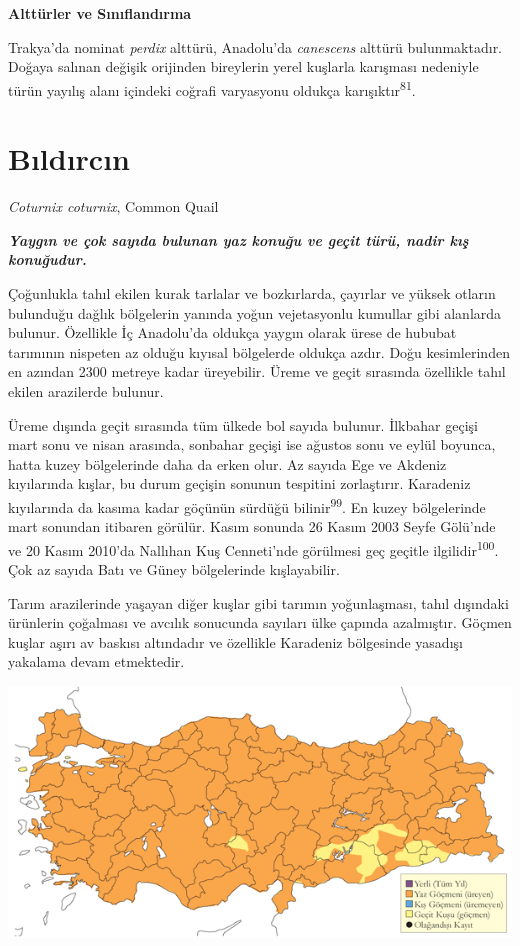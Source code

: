 \documentclass[
  letterpaper,
  DIV=11,
  numbers=noendperiod]{scrreprt}
\begin{document}
\textbf{Alttürler ve Sınıflandırma}

Trakya'da nominat \emph{perdix} alttürü, Anadolu'da \emph{canescens}
alttürü bulunmaktadır. Doğaya salınan değişik orijinden bireylerin yerel
kuşlarla karışması nedeniyle türün yayılış alanı içindeki coğrafi
varyasyonu oldukça karışıktır\textsuperscript{81}.

\hypertarget{bux131ldux131rcux131n}{%
\section{Bıldırcın}\label{bux131ldux131rcux131n}}

\emph{Coturnix coturnix}, Common Quail

\textbf{\emph{Yaygın ve çok sayıda bulunan yaz konuğu ve geçit türü,
nadir kış konuğudur.}}

Çoğunlukla tahıl ekilen kurak tarlalar ve bozkırlarda, çayırlar ve
yüksek otların bulunduğu dağlık bölgelerin yanında yoğun vejetasyonlu
kumullar gibi alanlarda bulunur. Özellikle İç Anadolu'da oldukça yaygın
olarak ürese de hububat tarımının nispeten az olduğu kıyısal bölgelerde
oldukça azdır. Doğu kesimlerinden en azından 2300 metreye kadar
üreyebilir. Üreme ve geçit sırasında özellikle tahıl ekilen arazilerde
bulunur.

Üreme dışında geçit sırasında tüm ülkede bol sayıda bulunur. İlkbahar
geçişi mart sonu ve nisan arasında, sonbahar geçişi ise ağustos sonu ve
eylül boyunca, hatta kuzey bölgelerinde daha da erken olur. Az sayıda
Ege ve Akdeniz kıyılarında kışlar, bu durum geçişin sonunun tespitini
zorlaştırır. Karadeniz kıyılarında da kasıma kadar göçünün sürdüğü
bilinir\textsuperscript{99}. En kuzey bölgelerinde mart sonundan
itibaren görülür. Kasım sonunda 26 Kasım 2003 Seyfe Gölü'nde ve 20 Kasım
2010'da Nallıhan Kuş Cenneti'nde görülmesi geç geçitle
ilgilidir\textsuperscript{100}. Çok az sayıda Batı ve Güney bölgelerinde
kışlayabilir.

Tarım arazilerinde yaşayan diğer kuşlar gibi tarımın yoğunlaşması, tahıl
dışındaki ürünlerin çoğalması ve avcılık sonucunda sayıları ülke çapında
azalmıştır. Göçmen kuşlar aşırı av baskısı altındadır ve özellikle
Karadeniz bölgesinde yasadışı yakalama devam etmektedir.

\includegraphics{images/harita_Page_043.png}
\end{document}
